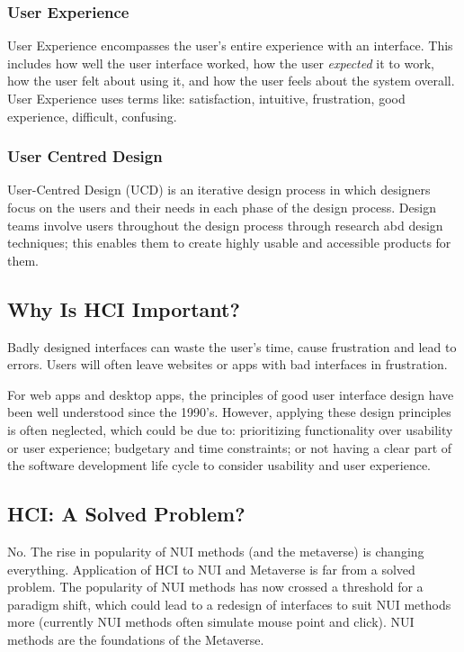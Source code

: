 \subsubsection*{User Experience}
User Experience encompasses the user's entire experience with an interface. This includes how well the user interface worked, how the user \textit{expected} it to work, how the user felt about using it, and how the user feels about the system overall. User Experience uses terms like: satisfaction, intuitive, frustration, good experience, difficult, confusing.
\subsubsection*{User Centred Design}
User-Centred Design (UCD) is an iterative design process in which designers focus on the users and their needs in each phase of the design process. Design teams involve users throughout the design process through research abd design techniques; this enables them to create highly usable and accessible products for them. 

\subsection*{Why Is HCI Important?}
Badly designed interfaces can waste the user's time, cause frustration and lead to errors. Users will often leave websites or apps with bad interfaces in frustration. 

For web apps and desktop apps, the principles of good user interface design have been well understood since the 1990's. However, applying these design principles is often neglected, which could be due to: prioritizing functionality over usability or user experience; budgetary and time constraints; or not having a clear part of the software development life cycle to consider usability and user experience. 

\subsection*{HCI: A Solved Problem?}
No. The rise in popularity of NUI methods (and the metaverse) is changing everything. Application of HCI to NUI and Metaverse is far from a solved problem. The popularity of NUI methods has now crossed a threshold for a paradigm shift, which could lead to a redesign of interfaces to suit NUI methods more (currently NUI methods often simulate mouse point and click). NUI methods are the foundations of the Metaverse. 

